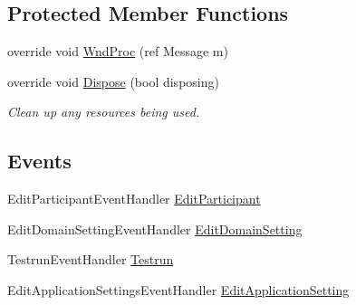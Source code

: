 \subsection*{Protected Member Functions}
\begin{DoxyCompactItemize}
\item 
override void \hyperlink{class_web_analyzer_1_1_u_i_1_1_h_t_m_l_u_i_a69b6ae98230372240893525305c0f4c2}{Wnd\+Proc} (ref Message m)
\item 
override void \hyperlink{class_web_analyzer_1_1_u_i_1_1_h_t_m_l_u_i_a8f64d2d40440500ce68bea7174c191bb}{Dispose} (bool disposing)
\begin{DoxyCompactList}\small\item\em Clean up any resources being used. \end{DoxyCompactList}\end{DoxyCompactItemize}
\subsection*{Events}
\begin{DoxyCompactItemize}
\item 
Edit\+Participant\+Event\+Handler \hyperlink{class_web_analyzer_1_1_u_i_1_1_h_t_m_l_u_i_a41d7bba18de0e030779e1bc57de9d267}{Edit\+Participant}
\item 
Edit\+Domain\+Setting\+Event\+Handler \hyperlink{class_web_analyzer_1_1_u_i_1_1_h_t_m_l_u_i_aec067a24868c0ce06c3dd5ca4caccd8b}{Edit\+Domain\+Setting}
\item 
Testrun\+Event\+Handler \hyperlink{class_web_analyzer_1_1_u_i_1_1_h_t_m_l_u_i_adb77cf3b6fe81466fc13561570764024}{Testrun}
\item 
Edit\+Application\+Settings\+Event\+Handler \hyperlink{class_web_analyzer_1_1_u_i_1_1_h_t_m_l_u_i_ab0a670a0a2407499af7b073c9f180657}{Edit\+Application\+Setting}
\end{DoxyCompactItemize}
